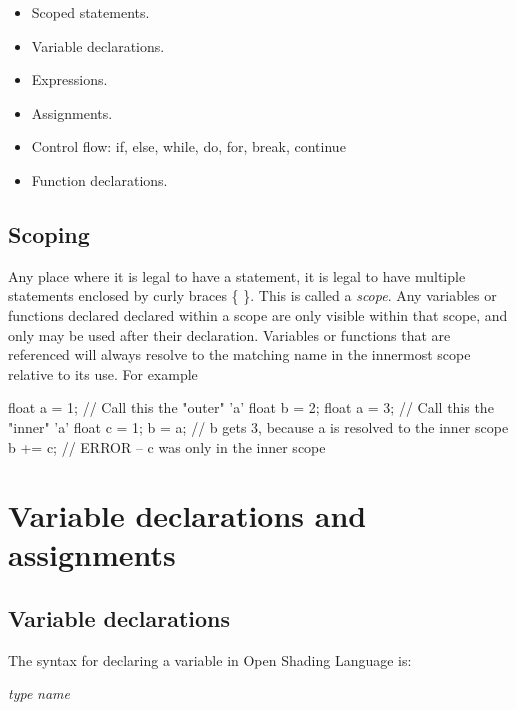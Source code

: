 \documentclass[11pt,letterpaper]{book}
\def\langname{Open Shading Language\xspace}
\def\illuminance{{\cf illuminance}\xspace}
\def\illuminate{{\cf illuminate}\xspace}
\begin{document}
\begin{itemize}
\item Scoped statements.
\item Variable declarations.
\item Expressions.
\item Assignments.
\item Control flow: {\cf if, else, while, do, for, break, continue}
\item Function declarations.
\end{itemize}

\subsection*{Scoping}

Any place where it is legal to have a statement, it is legal to have
multiple statements enclosed by curly braces {\cf \{ \}}.  This is
called a \emph{scope}.  Any variables or functions declared declared
within a scope are only visible within that scope, and only may be used
after their declaration.  Variables or functions that are referenced
will always resolve to the matching name in the innermost scope relative
to its use.  For example

\begin{code}
    float a = 1;      // Call this the "outer" 'a'
    float b = 2;
    {
        float a = 3;  // Call this the "inner" 'a'
        float c = 1;
        b = a;        // b gets 3, because a is resolved to the inner scope
    }
    b += c;           // ERROR -- c was only in the inner scope

\end{code}



\section{Variable declarations and assignments}
\label{sec:vardeclsassignments}

\subsection{Variable declarations}
\label{sec:vardecls}

The syntax for declaring a variable in \langname is:

\vspace{12pt}
\spc \emph{type} \emph{name} 
\end{document}
